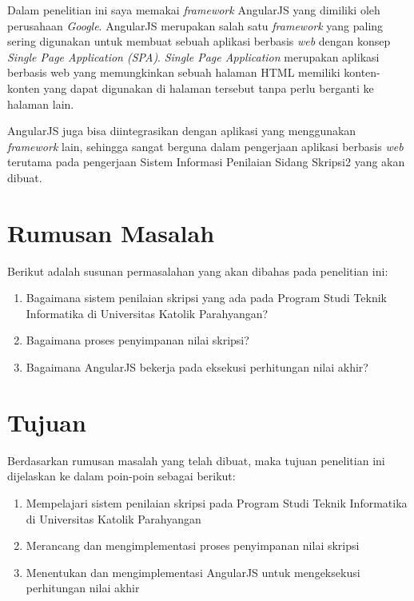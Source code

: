 	Dalam penelitian ini saya memakai \textit{framework} AngularJS yang dimiliki oleh perusahaan \textit{Google}. AngularJS merupakan salah satu \textit{framework} yang paling sering digunakan untuk membuat sebuah aplikasi berbasis \textit{web} dengan konsep \textit{Single Page Application (SPA)}. \textit{Single Page Application} merupakan aplikasi berbasis web yang memungkinkan sebuah halaman HTML memiliki konten-konten yang dapat digunakan di halaman tersebut tanpa perlu berganti ke halaman lain.
	
	AngularJS juga bisa diintegrasikan dengan aplikasi yang menggunakan \textit{framework} lain, sehingga sangat berguna dalam pengerjaan aplikasi berbasis \textit{web} terutama pada pengerjaan Sistem Informasi Penilaian Sidang Skripsi2 yang akan dibuat.
	
\section{Rumusan Masalah}
\label{sec: rumusanMasalah}

	Berikut adalah susunan permasalahan yang akan dibahas pada penelitian ini:
	\begin{enumerate}
		\item Bagaimana sistem penilaian skripsi yang ada pada Program Studi Teknik Informatika di Universitas Katolik Parahyangan?
		\item Bagaimana proses penyimpanan nilai skripsi?
		\item Bagaimana AngularJS bekerja pada eksekusi perhitungan nilai akhir?
	\end{enumerate}

\section{Tujuan}
\label{sec: tujuan}

	Berdasarkan rumusan masalah yang telah dibuat, maka tujuan penelitian ini dijelaskan ke dalam poin-poin sebagai berikut:
	\begin{enumerate}
		\item Mempelajari sistem penilaian skripsi pada Program Studi Teknik Informatika di Universitas Katolik Parahyangan
		\item Merancang dan mengimplementasi proses penyimpanan nilai skripsi
		\item Menentukan dan mengimplementasi AngularJS untuk mengeksekusi perhitungan nilai akhir
	\end{enumerate}
	
